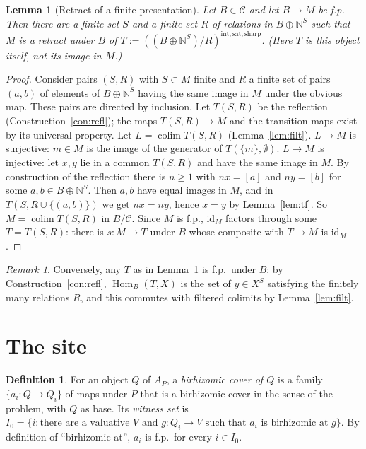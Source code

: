 \documentclass[11pt]{article}
\newtheorem{lemma}[theorem]{Lemma}
\theoremstyle{definition}
\newtheorem{definition}[theorem]{Definition}
\theoremstyle{remark}
\newtheorem{remark}[theorem]{Remark}
\newcommand{\N}{\mathbb{N}}
\newcommand{\cC}{\mathcal{C}}
\newcommand{\Hom}{\operatorname{Hom}}
\newcommand{\colim}{\operatorname*{colim}}
\newcommand{\rfl}{\mathrm{int,sat,sharp}}
\begin{document}
\begin{lemma}[Retract of a finite presentation]\label{lem:retract}
Let $B\in\cC$ and let $B\to M$ be f.p. Then there are a finite set $S$ and a finite set $R$ of relations in $B\oplus\N^S$ such that $M$ is a retract under $B$ of $T:=((B\oplus\N^S)/R)^{\rfl}$. (Here $T$ is this object itself, not its image in $M$.)
\end{lemma}
\begin{proof}
Consider pairs $(S,R)$ with $S\subset M$ finite and $R$ a finite set of pairs $(a,b)$ of elements of $B\oplus\N^S$ having the same image in $M$ under the obvious map. These pairs are directed by inclusion. Let $T(S,R)$ be the reflection (Construction~\ref{con:refl}); the maps $T(S,R)\to M$ and the transition maps exist by its universal property. Let $L=\colim T(S,R)$ (Lemma~\ref{lem:filt}).
$L\to M$ is surjective: $m\in M$ is the image of the generator of $T(\{m\},\emptyset)$.
$L\to M$ is injective: let $x,y$ lie in a common $T(S,R)$ and have the same image in $M$. By construction of the reflection there is $n\ge1$ with $nx=[a]$ and $ny=[b]$ for some $a,b\in B\oplus\N^S$. Then $a,b$ have equal images in $M$, and in $T(S,R\cup\{(a,b)\})$ we get $nx=ny$, hence $x=y$ by Lemma~\ref{lem:tf}.
So $M=\colim T(S,R)$ in $B/\cC$. Since $M$ is f.p., $\mathrm{id}_M$ factors through some $T=T(S,R)$: there is $s\colon M\to T$ under $B$ whose composite with $T\to M$ is $\mathrm{id}_M$.
\end{proof}

\begin{remark}
Conversely, any $T$ as in Lemma~\ref{lem:retract} is f.p.\ under $B$: by Construction~\ref{con:refl}, $\Hom_B(T,X)$ is the set of $y\in X^S$ satisfying the finitely many relations $R$, and this commutes with filtered colimits by Lemma~\ref{lem:filt}.
\end{remark}

\section{The site}\label{sec:site}

\begin{definition}
For an object $Q$ of $A_P$, a \emph{birhizomic cover of $Q$} is a family $\{a_i\colon Q\to Q_i\}$ of maps under $P$ that is a birhizomic cover in the sense of the problem, with $Q$ as base. Its \emph{witness set} is $I_0=\{i:\text{there are a valuative } V \text{ and } g\colon Q_i\to V \text{ such that } a_i \text{ is birhizomic at } g\}$. By definition of ``birhizomic at'', $a_i$ is f.p.\ for every $i\in I_0$.
\end{definition}
\end{document}
